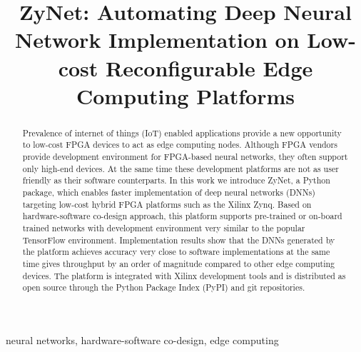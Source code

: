 \documentclass[conference]{IEEEtran}
\begin{document}
\title{ZyNet: Automating Deep Neural Network Implementation on Low-cost Reconfigurable Edge Computing Platforms}

\maketitle

\begin{abstract}
Prevalence of internet of things (IoT) enabled applications provide a new opportunity to low-cost FPGA devices to act as edge computing nodes. Although FPGA vendors provide development environment for FPGA-based neural networks, they often support only high-end devices. At the same time these development platforms are not as user friendly as their software counterparts. In this work we introduce ZyNet, a Python package, which enables faster implementation of deep neural networks (DNNs) targeting low-cost hybrid FPGA platforms such as the Xilinx Zynq. Based on hardware-software co-design approach, this platform supports pre-trained or on-board trained networks with development environment very similar to the popular TensorFlow environment. Implementation results show that the DNNs generated by the platform achieves accuracy very close to software implementations at the same time gives throughput by an order of magnitude compared to other edge computing devices. The platform is integrated with Xilinx development tools and is distributed as open source through the Python Package Index (PyPI) and git repositories. 
\end{abstract}

\begin{IEEEkeywords}
neural networks, hardware-software co-design, edge computing
\end{IEEEkeywords}









\end{document}
